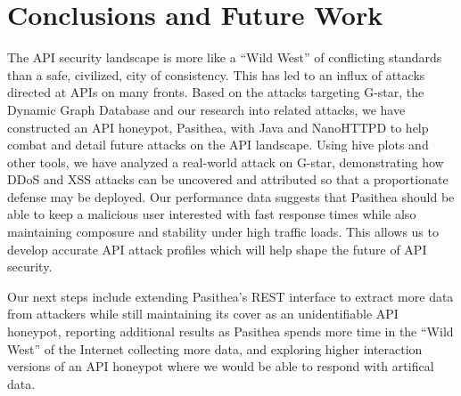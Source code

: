 
\section{Conclusions and Future Work} \label{conclusions}

The API security landscape is more like a ``Wild West'' of conflicting standards than a safe, civilized, city of consistency.
This has led to an influx of attacks directed at APIs on many  fronts. 
Based on the attacks targeting G-star, the Dynamic Graph Database and our research into related attacks, we have constructed an API honeypot, Pasithea, with Java and NanoHTTPD to help combat and detail future attacks on the API landscape. 
Using hive plots and other tools, we have analyzed a real-world attack on G-star, demonstrating how DDoS and XSS attacks can be uncovered and attributed so that a proportionate defense may be deployed.  
Our performance data suggests that Pasithea should be able to keep a malicious user interested with fast response times while also maintaining composure and stability under high traffic loads. 
This allows us to develop accurate API attack profiles which will help shape the future of API security.

Our next steps include extending Pasithea’s REST interface to extract more data from attackers while still maintaining its cover as an unidentifiable API honeypot, reporting additional results as Pasithea spends more time in the ``Wild West'' of the Internet collecting more data, and exploring higher interaction versions of an API honeypot where we would be able to respond with artifical data.
